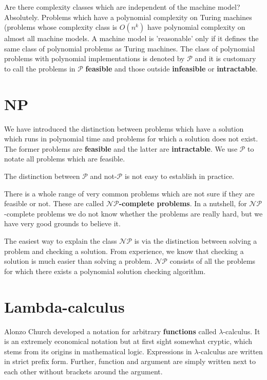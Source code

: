 \documentclass[11pt]{article}
\begin{document}
	\par Are there complexity classes which are independent of the machine model? Absolutely. Problems which have a polynomial complexity on Turing machines (problems whose complexity class is $O(n^{k})$ have polynomial complexity on almost all machine models. A machine model is 'reasonable' only if it defines the same class of polynomial problems as Turing machines. The class of polynomial problems with polynomial implementations is denoted by $\mathcal{P}$ and it is customary to call the problems in $\mathcal{P}$ \textbf{feasible} and those outside \textbf{infeasible} or \textbf{intractable}.
	
	\section{NP}
	We have introduced the distinction between problems which have a solution which runs in polynomial time and problems for which a solution does not exist. The former problems are \textbf{feasible} and the latter are \textbf{intractable}. We use $\mathcal{P}$ to notate all problems which are feasible.
	
	\par 
	The distinction between $\mathcal{P}$ and not-$\mathcal{P}$ is not easy to establish in practice.
	
	\par 
	There is a whole range of very common problems which are not sure if they are feasible or not. These are called \textbf{$\mathcal{NP}$-complete problems}. In a nutshell, for $\mathcal{NP}$-complete problems we do not know whether the problems are really hard, but we have very good grounds to believe it.
	
	\par 
	The easiest way to explain the class $\mathcal{NP}$ is via the distinction between solving a problem and checking a solution. From experience, we know that checking a solution is much easier than solving a problem. $\mathcal{NP}$ consists of all the problems for which there exists a polynomial solution checking algorithm.
	
	\section{Lambda-calculus}
	Alonzo Church developed a notation for arbitrary \textbf{functions} called $\lambda$-calculus. It is an extremely economical notation but at first sight somewhat cryptic, which stems from its origins in mathematical logic. Expressions in $\lambda$-calculus are written in strict prefix form. Further, function and argument are simply written next to each other without brackets around the argument.
	
\end{document}
